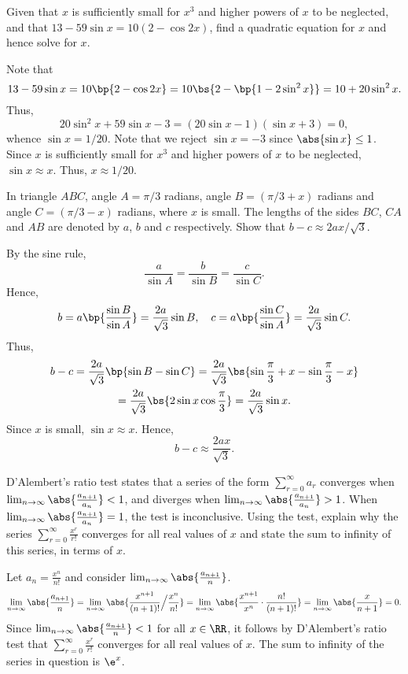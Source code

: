 \begin{problem}
    Given that $x$ is sufficiently small for $x^3$ and higher powers of $x$ to be neglected, and that $13 - 59\sin x = 10(2 - \cos 2x)$, find a quadratic equation for $x$ and hence solve for $x$.
\end{problem}
\begin{solution}
    Note that \[13-59\sin x = 10\bp{2 - \cos 2x} = 10\bs{2 - \bp{1-2\sin^2 x}} = 10 + 20\sin^2 x.\] Thus, \[20\sin^2 x + 59 \sin x - 3 = (20 \sin x - 1)(\sin x + 3) = 0,\] whence $\sin x = 1/20$. Note that we reject $\sin x = -3$ since $\abs{\sin x} \leq 1$. Since $x$ is sufficiently small for $x^3$ and higher powers of $x$ to be neglected, $\sin x \approx x$. Thus, $x \approx 1/20$.
\end{solution}

\begin{problem}
    In triangle $ABC$, angle $A = \pi/3$ radians, angle $B = (\pi/3 + x)$ radians and angle $C = (\pi/3 - x)$ radians, where $x$ is small. The lengths of the sides $BC$, $CA$ and $AB$ are denoted by $a$, $b$ and $c$ respectively. Show that $b-c \approx 2ax/\sqrt3$.
\end{problem}
\begin{solution}
    By the sine rule, \[\frac{a}{\sin A} = \frac{b}{\sin B} = \frac{c}{\sin C}.\] Hence, \[b = a\bp{\frac{\sin B}{\sin A}} = \frac{2a}{\sqrt3}\sin B, \quad c = a \bp{\frac{\sin C}{\sin A}} = \frac{2a}{\sqrt3}\sin C.\] Thus,
    \begin{gather*}
        b - c = \frac{2a}{\sqrt 3} \bp{\sin B - \sin C} = \frac{2a}{\sqrt3} \bs{\sin{\frac\pi3 + x} - \sin{\frac\pi3 - x}}\\
        = \frac{2a}{\sqrt3} \bs{2\sin x \cos \frac\pi3} = \frac{2a}{\sqrt3} \sin x.
    \end{gather*}
    Since $x$ is small, $\sin x \approx x$. Hence, \[b - c \approx \frac{2ax}{\sqrt3}.\]
\end{solution}

\begin{problem}
    D'Alembert's ratio test states that a series of the form $\sum_{r = 0}^\infty a_r$ converges when $\lim_{n \to \infty} \abs{\frac{a_{n+1}}{a_n}} < 1$, and diverges when $\lim_{n \to \infty} \abs{\frac{a_{n+1}}{a_n}} > 1$. When $\lim_{n \to \infty} \abs{\frac{a_{n+1}}{a_n}} = 1$, the test is inconclusive. Using the test, explain why the series $\sum_{r=0}^\infty \frac{x^r}{r!}$ converges for all real values of $x$ and state the sum to infinity of this series, in terms of $x$.
\end{problem}
\begin{solution}
    Let $a_n = \frac{x^n}{n!}$ and consider $\lim_{n \to \infty} \abs{\frac{a_{n+1}}{n}}$. \[\lim_{n \to \infty} \abs{\frac{a_{n+1}}{n}} = \lim_{n \to \infty} \abs{\frac{x^{n+1}}{(n+1)!} \Big/ \frac{x^n}{n!}} = \lim_{n \to \infty} \abs{\frac{x^{n+1}}{x^n} \cdot \frac{n!}{(n+1)!}} = \lim_{n \to \infty} \abs{\frac{x}{n+1}} = 0.\] Since $\lim_{n \to \infty} \abs{\frac{a_{n+1}}{n}} < 1$ for all $x \in \RR$, it follows by D'Alembert's ratio test that $\sum_{r=0}^\infty \frac{x^r}{r!}$ converges for all real values of $x$. The sum to infinity of the series in question is $\e^x$.
\end{solution}
